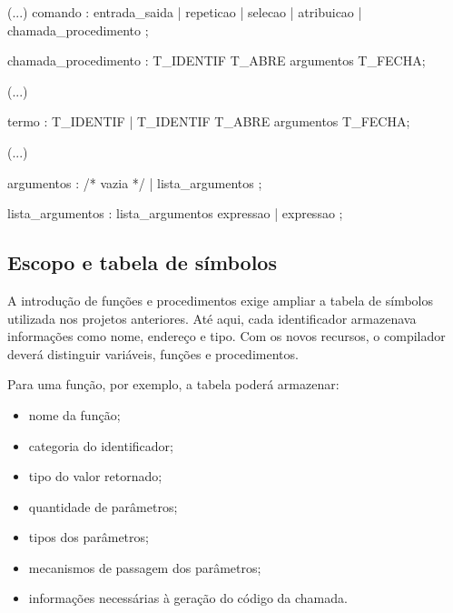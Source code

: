 \documentclass[
  brazilian,
  letterpaper,
]{book}
\newenvironment{Shaded}{\begin{snugshade}}{\end{snugshade}}
\newcommand{\CommentTok}[1]{\textcolor[rgb]{0.37,0.37,0.37}{#1}}
\newcommand{\NormalTok}[1]{\textcolor[rgb]{0.00,0.23,0.31}{#1}}
\newcommand{\OperatorTok}[1]{\textcolor[rgb]{0.37,0.37,0.37}{#1}}
\providecommand{\tightlist}{%
  \setlength{\itemsep}{0pt}\setlength{\parskip}{0pt}}
\theoremstyle{plain}
\theoremstyle{definition}
\theoremstyle{remark}
\begin{document}
\begin{Shaded}
\begin{Highlighting}[]
\OperatorTok{(...)}
\NormalTok{comando }
  \OperatorTok{:}\NormalTok{ entrada\_saida }
  \OperatorTok{|}\NormalTok{ repeticao }
  \OperatorTok{|}\NormalTok{ selecao }
  \OperatorTok{|}\NormalTok{ atribuicao}
  \OperatorTok{|}\NormalTok{ chamada\_procedimento }
  \OperatorTok{;}

\NormalTok{chamada\_procedimento}
  \OperatorTok{:}\NormalTok{ T\_IDENTIF T\_ABRE argumentos T\_FECHA}\OperatorTok{;}

\OperatorTok{(...)}

\NormalTok{termo }
  \OperatorTok{:}\NormalTok{ T\_IDENTIF }
  \OperatorTok{|}\NormalTok{ T\_IDENTIF T\_ABRE argumentos T\_FECHA}\OperatorTok{;}

\OperatorTok{(...)}

\NormalTok{argumentos }
  \OperatorTok{:} \CommentTok{/* vazia */}
  \OperatorTok{|}\NormalTok{ lista\_argumentos }\OperatorTok{;}

\NormalTok{lista\_argumentos }
  \OperatorTok{:}\NormalTok{ lista\_argumentos expressao }
  \OperatorTok{|}\NormalTok{ expressao}
  \OperatorTok{;}
\end{Highlighting}
\end{Shaded}

\subsection{Escopo e tabela de
símbolos}\label{escopo-e-tabela-de-suxedmbolos}

A introdução de funções e procedimentos exige ampliar a tabela de
símbolos utilizada nos projetos anteriores. Até aqui, cada identificador
armazenava informações como nome, endereço e tipo. Com os novos
recursos, o compilador deverá distinguir variáveis, funções e
procedimentos.

Para uma função, por exemplo, a tabela poderá armazenar:

\begin{itemize}
\tightlist
\item
  nome da função;
\item
  categoria do identificador;
\item
  tipo do valor retornado;
\item
  quantidade de parâmetros;
\item
  tipos dos parâmetros;
\item
  mecanismos de passagem dos parâmetros;
\item
  informações necessárias à geração do código da chamada.
\end{itemize}
\end{document}
